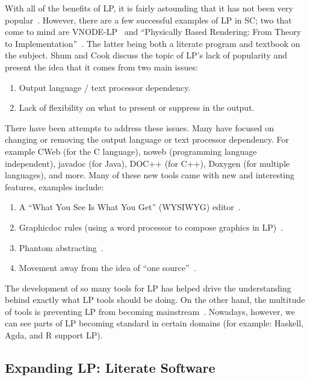 \documentclass[preprint, 10pt]{sigplanconf}
\begin{document}
With all of the benefits of LP, it is fairly astounding that it has not been very
popular~\cite{ShumAndCook1993}.  However, there are a few successful examples of LP in
SC; two that come to mind are VNODE-LP~\cite{Nedialkov2006} and
``Physically Based Rendering: From Theory to
Implementation''~\cite{PharrAndHumphreys2004}. The latter being both a literate
program and textbook on the subject. Shum and Cook discuss the topic of LP's
lack of popularity and present the idea that it comes from two main
issues:

\begin{enumerate}
\item Output language / text processor dependency.
\item Lack of flexibility on what to present or suppress in the output.
\end{enumerate}

There have been attempts to address these issues. Many have focused on changing or
removing the output language or text processor dependency. For example CWeb (for
the C language), noweb (programming language independent), javadoc (for Java),
DOC++ (for C++), Doxygen (for multiple languages), and more. Many of these new
tools came with new and interesting features, examples include:

\begin{enumerate}
\item A ``What You See Is What You Get'' (WYSIWYG)
editor~\cite{FritzsonGunnarssonAndJirstrand2002}.
\item Graphicdoc rules (using a word processor to compose graphics in
LP)~\cite{ShumAndCook1993}.
\item Phantom abstracting~\cite{ShumAndCook1993}.
\item Movement away from the idea of ``one source''~\cite{Simonis2003}.
\end{enumerate}

The development of so many tools for LP has helped drive the understanding
behind exactly what LP tools should be doing. On the other hand, the multitude
of tools is preventing LP from becoming mainstream~\cite{Ramsey1994}. Nowadays,
however, we can see parts of LP becoming standard in certain domains (for
example: Haskell, Agda, and R support LP).

\subsection{Expanding LP: Literate Software}
\end{document}
